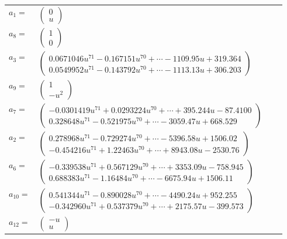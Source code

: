 \documentclass[1p]{elsarticle_modified}
\theoremstyle{definition}
\begin{document}
\begin{tabular}{m{7pt} m{180pt} m{7pt} m{180pt} }
\flushright $a_{1}=$&$\begin{pmatrix}0\\u\end{pmatrix}$ \\
\flushright $a_{8}=$&$\begin{pmatrix}1\\0\end{pmatrix}$ \\
\flushright $a_{3}=$&$\begin{pmatrix}0.0671046 u^{71}-0.167151 u^{70}+\cdots-1109.95 u+319.364\\0.0549952 u^{71}-0.143792 u^{70}+\cdots-1113.13 u+306.203\end{pmatrix}$ \\
\flushright $a_{9}=$&$\begin{pmatrix}1\\- u^2\end{pmatrix}$ \\
\flushright $a_{7}=$&$\begin{pmatrix}-0.0301419 u^{71}+0.0293224 u^{70}+\cdots+395.244 u-87.4100\\0.328648 u^{71}-0.521975 u^{70}+\cdots-3059.47 u+668.529\end{pmatrix}$ \\
\flushright $a_{2}=$&$\begin{pmatrix}0.278968 u^{71}-0.729274 u^{70}+\cdots-5396.58 u+1506.02\\-0.454216 u^{71}+1.22463 u^{70}+\cdots+8943.08 u-2530.76\end{pmatrix}$ \\
\flushright $a_{6}=$&$\begin{pmatrix}-0.339538 u^{71}+0.567129 u^{70}+\cdots+3353.09 u-758.945\\0.688383 u^{71}-1.16484 u^{70}+\cdots-6675.94 u+1506.11\end{pmatrix}$ \\
\flushright $a_{10}=$&$\begin{pmatrix}0.541344 u^{71}-0.890028 u^{70}+\cdots-4490.24 u+952.255\\-0.342960 u^{71}+0.537379 u^{70}+\cdots+2175.57 u-399.573\end{pmatrix}$ \\
\flushright $a_{12}=$&$\begin{pmatrix}- u\\u\end{pmatrix}$ \\

\end{tabular}
\end{document}
